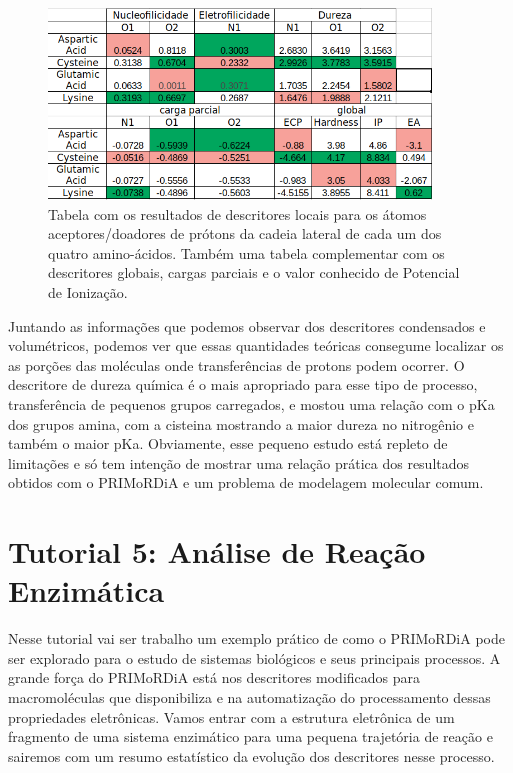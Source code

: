 \documentclass[a4paper,11pt]{refart}
\begin{document}
\hspace*{-\leftmarginwidth}
\begin{minipage}{\fullwidth}
	\begin{figure}[H]
		\begin{center}
			\includegraphics[width=4in]{images/tut4_img18}
			\caption{Tabela com os resultados de descritores locais para os átomos aceptores/doadores de prótons da cadeia lateral de cada um dos quatro amino-ácidos. Também uma tabela complementar com os descritores globais, cargas parciais e o valor conhecido de Potencial de Ionização.}
			\label{fig_tut4_16}
		\end{center}
	\end{figure}
\end{minipage}

Juntando as informações que podemos observar dos descritores condensados e volumétricos, podemos ver que essas quantidades teóricas consegume localizar os as porções das moléculas onde transferências de protons podem ocorrer. O descritore de dureza química é o mais apropriado para esse tipo de processo, transferência de pequenos grupos carregados, e mostou uma relação com o pKa dos grupos amina, com a cisteina mostrando a maior dureza no nitrogênio e também o maior pKa. Obviamente, esse pequeno estudo está repleto de limitações e só tem intenção de mostrar uma relação prática dos resultados obtidos com o PRIMoRDiA e um problema de modelagem molecular comum.

\newpage
\section{Tutorial 5: Análise de Reação Enzimática}

Nesse tutorial vai ser trabalho um exemplo prático de como o PRIMoRDiA pode ser explorado para o estudo de sistemas biológicos e seus principais processos. A grande força do PRIMoRDiA está nos descritores modificados para macromoléculas que disponibiliza e na automatização do processamento dessas propriedades eletrônicas. Vamos entrar com a estrutura eletrônica de um fragmento de uma sistema enzimático para uma pequena trajetória de reação e sairemos com um resumo estatístico da evolução dos descritores nesse processo.
\end{document}
